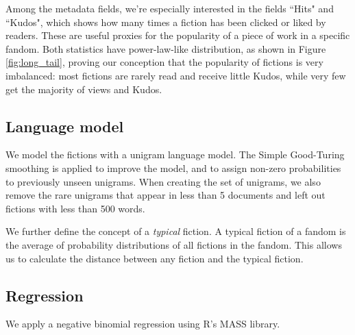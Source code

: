 \documentclass[a4paper]{article}
\begin{document}
Among the metadata fields, we're especially interested in the fields ``Hits" and ``Kudos", which shows how many times a fiction has been clicked or liked by readers. These are useful proxies for the popularity of a piece of work in a specific fandom.
Both statistics have power-law-like distribution, as shown in  Figure \ref{fig:long_tail}, proving our conception that the popularity of fictions is very imbalanced: most fictions are rarely read and receive little Kudos, while very few get the majority of views and Kudos.


\subsection{Language model}
We model the fictions with a unigram language model. The Simple Good-Turing smoothing\cite{gales1995good} is applied to improve the model, and to assign non-zero probabilities to previously unseen unigrams. When creating the set of unigrams, we also remove the rare unigrams that appear in less than 5 documents and left out fictions with less than 500 words.


We further define the concept of a \emph{typical} fiction. A typical fiction of a fandom is the average of probability distributions of all fictions in the fandom. This allows us to calculate the distance between any fiction and the typical fiction. 

\subsection{Regression}
We apply a negative binomial regression using R's MASS library. 











    
\end{document}
